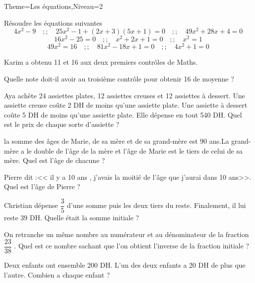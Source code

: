 \documentclass[a4paper,12pt]{article}
\begin{document}
\begin{Maquette}[Fiche]{Theme=Les équations,Niveau=2}
\begin{exercice}
Résoudre les équations suivantes 
\[
4x^{2}-9 \quad ;; \quad
25x^{2}-1+(2x+3)(5x+1)=0\quad ;; \quad
49x^{2}+28x+4=0
\]
\[
16x^{2}-25=0\quad ;; \quad
x^{2}+2x+1=0\quad ;; \quad
x^{2}=1
\]
\[
49x^{2}=16\quad ;; \quad
81x^{2}-18x+1=0\quad ;; \quad
4x^{2}+1=0
\]
\end{exercice}

\begin{exercice}
Karim a obtenu 11 et 16 aux deux premiers contrôles de Maths.

Quelle note doit-il avoir au troisième contrôle pour obtenir 16 de moyenne ?
\end{exercice}

\begin{exercice}
Aya achète 24 assiettes plates, 12 assiettes creuses et 12 assiettes à dessert. Une assiette creuse coûte 2 DH de moins qu'une assiette plate. Une assiette à dessert coûte 5 DH de moins qu'une assiette plate. Elle dépense en tout 540 DH. Quel est le prix de chaque sorte d'assiette ?
\end{exercice}

\begin{exercice}
la somme des âges de Marie, de sa mère et de sa grand-mère est 90 ans.La grand-mère a le double de l'âge de la mère et l'âge de Marie est le tiers de celui de sa mère.
Quel est l'âge de chacune ?
\end{exercice}

\begin{exercice}
Pierre dit :<< il y a 10 ans , j'avais la moitié de l'âge que j'aurai dans 10 ans>>. Quel est l'âge de Pierre ?
\end{exercice}

\begin{exercice}
Christian dépense $\dfrac{3}{5}$ d'une somme puis les deux tiers du reste. Finalement, il lui reste 39 DH. Quelle était la somme initiale ?
\end{exercice}

\begin{exercice}
On retranche un même nombre au numérateur et au dénominateur de la fraction $\dfrac{23}{38}$ . Quel est ce nombre sachant que l'on obtient l'inverse de la fraction initiale ?
\end{exercice}

\begin{exercice}
Deux enfants ont ensemble 200 DH. L'un des deux  enfants a 20 DH de plus que l'autre. Combien a chaque enfant ?
\end{exercice}


\end{Maquette}
\end{document}
